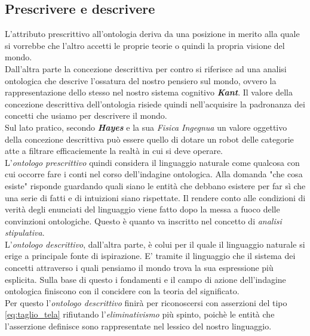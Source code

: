 \documentclass[a4paper,12pt]{article}
\begin{document}
\subsection{Prescrivere e descrivere} %
L'attributo prescrittivo all'ontologia deriva da una posizione in merito alla quale si vorrebbe che l'altro accetti
le proprie teorie o quindi la propria visione del mondo.
\\ Dall'altra parte la concezione descrittiva per contro si riferisce ad una analisi ontologica che descrive l'ossatura
del nostro pensiero sul mondo, ovvero la rappresentazione dello stesso nel nostro sistema cognitivo \textbf{\textit{Kant}}.
Il valore della concezione descrittiva dell'ontologia risiede quindi nell'acquisire la padronanza dei concetti che usiamo
per descrivere il mondo.
\\ Sul lato pratico, secondo \textbf{\textit{Hayes}} e la sua \textit{Fisica Ingegnua} un valore oggettivo della concezione
descrittiva può essere quello di dotare un robot delle categorie atte a filtrare efficaciemente la realtà in cui si deve
operare.
\\ L'\textit{ontologo prescrittivo} quindi considera il linguaggio naturale come qualcosa con cui occorre fare i conti
nel corso dell'indagine ontologica. Alla domanda "che cosa esiste" risponde guardando quali siano le entità che debbano
esistere per far sì che una serie di fatti e di intuizioni siano rispettate. Il rendere conto alle condizioni di verità
degli enunciati del linguaggio viene fatto dopo la messa a fuoco delle convinzioni ontologiche. Questo è quanto va inscritto
nel concetto di \textit{analisi stipulativa}.
\\ L'\textit{ontologo descrittivo}, dall'altra parte, è colui per il quale il linguaggio naturale si erige a principale
fonte di ispirazione. E' tramite il linguaggio che il sistema dei concetti attraverso i quali pensiamo il mondo trova la sua
espressione più esplicita. Sulla base di questo i fondamenti e il campo di azione dell'indagine ontologica finiscono con 
il concidere con la teoria del significato.
\\ Per questo l'\textit{ontologo descrittivo} finirà per riconoscersi con asserzioni del tipo \eqref{eq:taglio_tela} rifiutando
l'\textit{eliminativismo} più spinto, poichè le entità che l'asserzione definisce sono rappresentate nel lessico del nostro
linguaggio.
\end{document}
